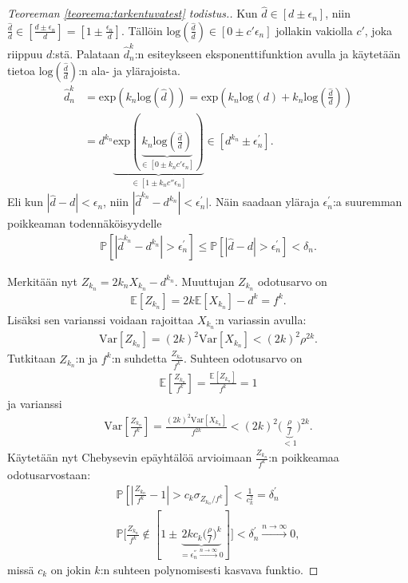 \documentclass[finnish,12pt,a4paper,pdftex,sci,utf8]{aaltothesis}
\begin{document}
\begin{proof}[Teoreeman \ref{teoreema:tarkentuvatest} todistus.]
	Kun $\hat{d} \in [d \pm \epsilon_{n}^{}]$, niin $\frac{\hat{d}}{d} \in [\frac{d \pm \epsilon_{n}^{}}{d}] = [1 \pm \frac{\epsilon_{n}^{}}{d}]$. Tällöin $\text{log}(\frac{\hat{d}}{d}) \in [0 \pm c'\epsilon_{n}^{}]$ jollakin vakiolla $c'$, joka riippuu $d$:stä.
	Palataan $\hat{d}^k_n$:n esiteykseen eksponenttifunktion avulla ja käytetään tietoa $\text{log}(\frac{\hat{d}}{d})$:n ala- ja ylärajoista.
	\begin{align*}
		\hat{d}^k_n &= \text{exp}(k_n \text{log}(\hat{d})) = \text{exp}(k_n\text{log}(d) + k_n \text{log}(\frac{\hat{d}}{d})) \\
		&= d^{k_n} \underbrace{\text{exp}(\underbrace{k_n \text{log}(\frac{\hat{d}}{d})}_{\in [0 \pm k_n c' \epsilon_{n}^{}]})}_{\in [1 \pm k_n c'' \epsilon_{n}^{}]} \in [d^{k_n} \pm \epsilon_{n}^{'}].
	\end{align*}
	Eli  kun $|\hat{d} - d| < \epsilon_{n}^{}$, niin $|\hat{d}^{k_n} - d^{k_n}| < \epsilon_{n}^{'}|$. Näin saadaan yläraja $\epsilon_{n}^{'}$:a suuremman poikkeaman todennäköisyydelle 
	\begin{align*}
		\mathbb{P}[|\hat{d}^{k_{n}} - d^{k_{n}}| > \epsilon_{n}^{'}] \leq \mathbb{P}[|\hat{d} - d| > \epsilon_{n}^{'}] < \delta_n.
	\end{align*}

	Merkitään nyt $Z_{k_{n}} = 2k_n X_{k_n} - d^{k_n}$. Muuttujan $Z_{k_n}$ odotusarvo on 
	\begin{align*}
		\mathbb{E}[Z_{k_n}] = 2k \mathbb{E}[X_{k_n}] - d^k = f^k.
	\end{align*}
	Lisäksi sen varianssi voidaan rajoittaa $X_{k_n}$:n variassin avulla: 
	\begin{align*}
		\text{Var}[Z_{k_n}] = (2k)^2\text{Var}[X_{k_n}] < (2k)^2 \rho^{2k}.
	\end{align*}
	Tutkitaan $Z_{k_n}$:n ja $f^k$:n suhdetta $\frac{Z_{k_n}}{f^k}$. Suhteen odotusarvo on
	\begin{align*}
		\mathbb{E}[\frac{Z_{k_n}}{f^k}] = \frac{\mathbb{E}[Z_{k_n}]}{f^k} = 1
	\end{align*}
	ja varianssi
	\begin{align*}
		\text{Var}[\frac{Z_{k_n}}{f^k}] = \frac{(2k)^2 \text{Var}[X_{k_n}]}{f^{2k}} < (2k)^{2} \big(\underbrace{\frac{\rho}{f} }_{ < 1}\big)^{2k}.
	\end{align*}
	Käytetään nyt Chebysevin epäyhtälöä arvioimaan $\frac{Z_{k_n}}{f^k}$:n poikkeamaa odotusarvostaan:
	\begin{align*}
		\mathbb{P}[|\frac{Z_{k_n}}{f^k} - 1| > c_k \sigma_{Z_{k_n}/f^k}] < \frac{1}{c_k^2}  = \delta_{n}^{'} \\
		\mathbb{P} \big[\frac{Z_{k_n}}{f^k} \notin [1 \pm \underbrace{2 k c_k \big( \frac{\rho}{f}\big)^k}_{= \epsilon_{n}^{''} \xrightarrow{n \rightarrow \infty} 0}] \big] < \delta_{n}^{'} \xrightarrow{n \rightarrow \infty} 0,
	\end{align*}
	missä $c_k$ on jokin $k$:n suhteen polynomisesti kasvava funktio.


\end{proof}
\end{document}

